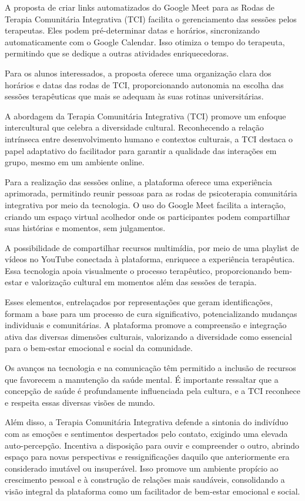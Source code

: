 A proposta de criar links automatizados do Google Meet para as Rodas de Terapia Comunitária Integrativa (TCI) facilita o gerenciamento das sessões pelos terapeutas. Eles podem pré-determinar datas e horários, sincronizando automaticamente com o Google Calendar. Isso otimiza o tempo do terapeuta, permitindo que se dedique a outras atividades enriquecedoras.

Para os alunos interessados, a proposta oferece uma organização clara dos horários e datas das rodas de TCI, proporcionando autonomia na escolha das sessões terapêuticas que mais se adequam às suas rotinas universitárias.

A abordagem da Terapia Comunitária Integrativa (TCI) promove um enfoque intercultural que celebra a diversidade cultural. Reconhecendo a relação intrínseca entre desenvolvimento humano e contextos culturais, a TCI destaca o papel adaptativo do facilitador para garantir a qualidade das interações em grupo, mesmo em um ambiente online.

Para a realização das sessões online, a plataforma oferece uma experiência aprimorada, permitindo reunir pessoas para as rodas de psicoterapia comunitária integrativa por meio da tecnologia. O uso do Google Meet facilita a interação, criando um espaço virtual acolhedor onde os participantes podem compartilhar suas histórias e momentos, sem julgamentos.

A possibilidade de compartilhar recursos multimídia, por meio de uma playlist de vídeos no YouTube conectada à plataforma, enriquece a experiência terapêutica. Essa tecnologia apoia visualmente o processo terapêutico, proporcionando bem-estar e valorização cultural em momentos além das sessões de terapia.

Esses elementos, entrelaçados por representações que geram identificações, formam a base para um processo de cura significativo, potencializando mudanças individuais e comunitárias. A plataforma promove a compreensão e integração ativa das diversas dimensões culturais, valorizando a diversidade como essencial para o bem-estar emocional e social da comunidade.

Os avanços na tecnologia e na comunicação têm permitido a inclusão de recursos que favorecem a manutenção da saúde mental. É importante ressaltar que a concepção de saúde é profundamente influenciada pela cultura, e a TCI reconhece e respeita essas diversas visões de mundo.

Além disso, a Terapia Comunitária Integrativa defende a sintonia do indivíduo com as emoções e sentimentos despertados pelo contato, exigindo uma elevada auto-percepção. Incentiva a disposição para ouvir e compreender o outro, abrindo espaço para novas perspectivas e ressignificações daquilo que anteriormente era considerado imutável ou insuperável. Isso promove um ambiente propício ao crescimento pessoal e à construção de relações mais saudáveis, consolidando a visão integral da plataforma como um facilitador de bem-estar emocional e social.



